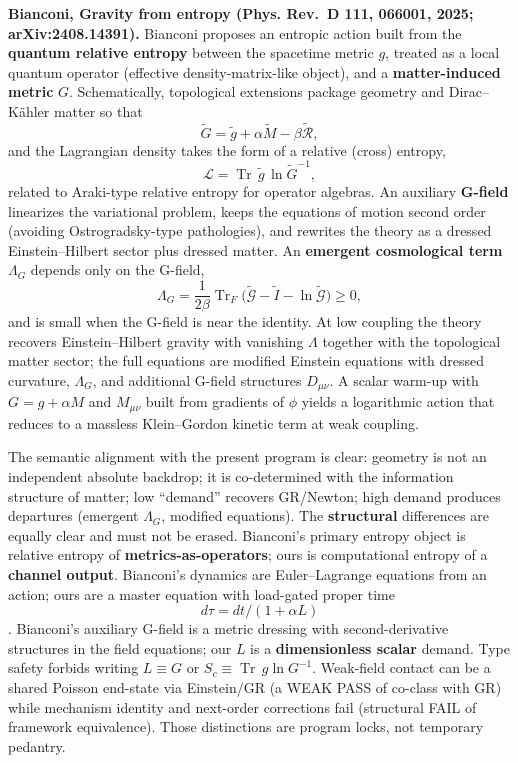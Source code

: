 \documentclass[
  11pt,
]{article}
\begin{document}
\textbf{Bianconi, Gravity from entropy (Phys. Rev.~D 111, 066001, 2025;
arXiv:2408.14391).} Bianconi proposes an entropic action built from the
\textbf{quantum relative entropy} between the spacetime metric \(g\),
treated as a local quantum operator (effective density-matrix-like
object), and a \textbf{matter-induced metric} \(G\). Schematically,
topological extensions package geometry and Dirac--Kähler matter so that
\[
\tilde G = \tilde g + \alpha \tilde M - \beta \tilde{\mathcal{R}},
\] and the Lagrangian density takes the form of a relative (cross)
entropy, \[
\mathcal{L} = \operatorname{Tr}\,\tilde g\,\ln \tilde G^{-1},
\] related to Araki-type relative entropy for operator algebras. An
auxiliary \textbf{G-field} linearizes the variational problem, keeps the
equations of motion second order (avoiding Ostrogradsky-type
pathologies), and rewrites the theory as a dressed Einstein--Hilbert
sector plus dressed matter. An \textbf{emergent cosmological term}
\(\Lambda_G\) depends only on the G-field, \[
\Lambda_G = \frac{1}{2\beta}\operatorname{Tr}_F\bigl(\tilde{\mathcal{G}} - \tilde I - \ln\tilde{\mathcal{G}}\bigr) \ge 0,
\] and is small when the G-field is near the identity. At low coupling
the theory recovers Einstein--Hilbert gravity with vanishing \(\Lambda\)
together with the topological matter sector; the full equations are
modified Einstein equations with dressed curvature, \(\Lambda_G\), and
additional G-field structures \(D_{\mu\nu}\). A scalar warm-up with
\(G = g + \alpha M\) and \(M_{\mu\nu}\) built from gradients of \(\phi\)
yields a logarithmic action that reduces to a massless Klein--Gordon
kinetic term at weak coupling.

The semantic alignment with the present program is clear: geometry is
not an independent absolute backdrop; it is co-determined with the
information structure of matter; low ``demand'' recovers GR/Newton; high
demand produces departures (emergent \(\Lambda_G\), modified equations).
The \textbf{structural} differences are equally clear and must not be
erased. Bianconi's primary entropy object is relative entropy of
\textbf{metrics-as-operators}; ours is computational entropy of a
\textbf{channel output}. Bianconi's dynamics are Euler--Lagrange
equations from an action; ours are a master equation with load-gated
proper time \[d\tau=dt/(1+\alpha L)\]. Bianconi's auxiliary G-field is a
metric dressing with second-derivative structures in the field
equations; our \(L\) is a \textbf{dimensionless scalar} demand. Type
safety forbids writing \(L \equiv G\) or
\(S_c \equiv \operatorname{Tr}\, g\ln G^{-1}\). Weak-field contact can
be a shared Poisson end-state via Einstein/GR (a WEAK PASS of co-class
with GR) while mechanism identity and next-order corrections fail
(structural FAIL of framework equivalence). Those distinctions are
program locks, not temporary pedantry.
\end{document}
